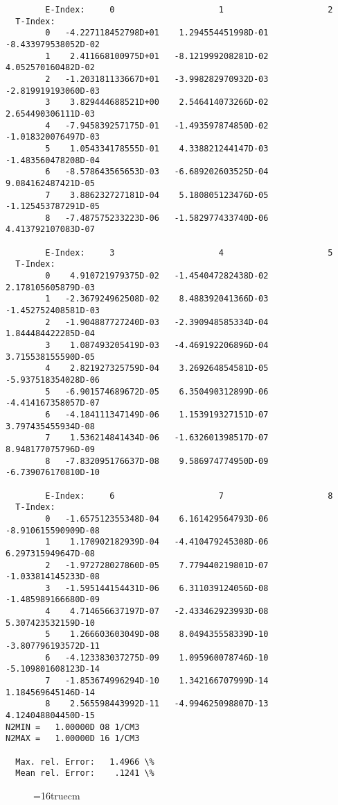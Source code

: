 \documentclass[12pt,dvipdfmx]{article}
\begin{document}
\begin{small}\begin{verbatim}
        E-Index:     0                     1                     2
  T-Index:
        0   -4.227118452798D+01    1.294554451998D-01   -8.433979538052D-02
        1    2.411668100975D+01   -8.121999208281D-02    4.052570160482D-02
        2   -1.203181133667D+01   -3.998282970932D-03   -2.819919193060D-03
        3    3.829444688521D+00    2.546414073266D-02    2.654490306111D-03
        4   -7.945839257175D-01   -1.493597874850D-02   -1.018320076497D-03
        5    1.054334178555D-01    4.338821244147D-03   -1.483560478208D-04
        6   -8.578643565653D-03   -6.689202603525D-04    9.084162487421D-05
        7    3.886232727181D-04    5.180805123476D-05   -1.125453787291D-05
        8   -7.487575233223D-06   -1.582977433740D-06    4.413792107083D-07

        E-Index:     3                     4                     5
  T-Index:
        0    4.910721979375D-02   -1.454047282438D-02    2.178105605879D-03
        1   -2.367924962508D-02    8.488392041366D-03   -1.452752408581D-03
        2   -1.904887727240D-03   -2.390948585334D-04    1.844484422285D-04
        3    1.087493205419D-03   -4.469192206896D-04    3.715538155590D-05
        4    2.821927325759D-04    3.269264854581D-05   -5.937518354028D-06
        5   -6.901574689672D-05    6.350490312899D-06   -4.414167358057D-07
        6   -4.184111347149D-06    1.153919327151D-07    3.797435455934D-08
        7    1.536214841434D-06   -1.632601398517D-07    8.948177075796D-09
        8   -7.832095176637D-08    9.586974774950D-09   -6.739076170810D-10

        E-Index:     6                     7                     8
  T-Index:
        0   -1.657512355348D-04    6.161429564793D-06   -8.910615590909D-08
        1    1.170902182939D-04   -4.410479245308D-06    6.297315949647D-08
        2   -1.972728027860D-05    7.779440219801D-07   -1.033814145233D-08
        3   -1.595144154431D-06    6.311039124056D-08   -1.485989166680D-09
        4    4.714656637197D-07   -2.433462923993D-08    5.307423532159D-10
        5    1.266603603049D-08    8.049435558339D-10   -3.807796193572D-11
        6   -4.123383037275D-09    1.095960078746D-10   -5.109801608123D-14
        7   -1.853674996294D-10    1.342166707999D-14    1.184569645146D-14
        8    2.565598443992D-11   -4.994625098807D-13    4.124048804450D-15
N2MIN =   1.00000D 08 1/CM3
N2MAX =   1.00000D 16 1/CM3

  Max. rel. Error:   1.4966 \%
  Mean rel. Error:    .1241 \%

\end{verbatim}\end{small}
\begin{figure} \label{2.3.9a}
\epsfxsize=16truecm
\end{figure}
\newpage
\end{document}
